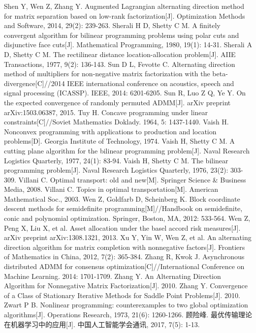 \begin{thebibliography}{MM}
\begin{small}
		 Shen Y, Wen Z, Zhang Y. Augmented Lagrangian alternating direction method for matrix separation based on low-rank factorization[J]. Optimization Methods and Software, 2014, 29(2): 239-263.
		 Sherali H D, Shetty C M. A finitely convergent algorithm for bilinear programming problems using polar cuts and disjunctive face cuts[J]. Mathematical Programming, 1980, 19(1): 14-31.
		 Sherali A D, Shetty C M. The rectilinear distance location-allocation problem[J]. AIIE Transactions, 1977, 9(2): 136-143.
		 Sun D L, Fevotte C. Alternating direction method of multipliers for non-negative matrix factorization with the beta-divergence[C]//2014 IEEE international conference on acoustics, speech and signal processing (ICASSP). IEEE, 2014: 6201-6205.
		 Sun R, Luo Z Q, Ye Y. On the expected convergence of randomly permuted ADMM[J]. arXiv preprint arXiv:1503.06387, 2015.
		 Tuy H. Concave programming under linear constraints[C]//Soviet Mathematics Doklady. 1964, 5: 1437-1440.
		 Vaish H. Nonconvex programming with applications to production and location problems[D]. Georgia Institute of Technology, 1974.
		 Vaish H, Shetty C M. A cutting plane algorithm for the bilinear programming problem[J]. Naval Research Logistics Quarterly, 1977, 24(1): 83-94.
		 Vaish H, Shetty C M. The bilinear programming problem[J]. Naval Research Logistics Quarterly, 1976, 23(2): 303-309.
		 Villani C. Optimal transport: old and new[M]. Springer Science \& Business Media, 2008.
		 Villani C. Topics in optimal transportation[M]. American Mathematical Soc., 2003.
		 Wen Z, Goldfarb D, Scheinberg K. Block coordinate descent methods for semidefinite programming[M]//Handbook on semidefinite, conic and polynomial optimization. Springer, Boston, MA, 2012: 533-564.
		 Wen Z, Peng X, Liu X, et al. Asset allocation under the basel accord risk measures[J]. arXiv preprint arXiv:1308.1321, 2013.
		 Xu Y, Yin W, Wen Z, et al. An alternating direction algorithm for matrix completion with nonnegative factors[J]. Frontiers of Mathematics in China, 2012, 7(2): 365-384.
		 Zhang R, Kwok J. Asynchronous distributed ADMM for consensus optimization[C]//International Conference on Machine Learning. 2014: 1701-1709.
		 Zhang Y. An Alternating Direction Algorithm for Nonnegative Matrix Factorization[J]. 2010.
		 Zhang Y. Convergence of a Class of Stationary Iterative Methods for Saddle Point Problems[J]. 2010.
		 Zwart P B. Nonlinear programming: counterexamples to two global optimization algorithms[J]. Operations Research, 1973, 21(6): 1260-1266.
		 顾险峰. 最优传输理论在机器学习中的应用[J]. 中国人工智能学会通讯, 2017, 7(5): 1-13.
	\end{small}
\end{thebibliography}

\newpage



